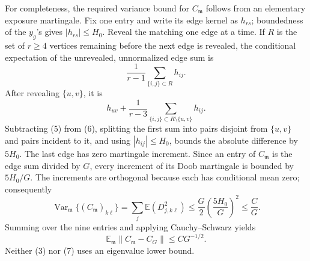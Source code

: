 For completeness, the required variance bound for \(C_{\mathfrak m}\) follows from an elementary exposure martingale.  Fix one entry and write its edge kernel as \(h_{rs}\); boundedness of the \(y_g\)'s gives \(|h_{rs}|\leq H_0\).  Reveal the matching one edge at a time.  If \(R\) is the set of \(r\geq4\) vertices remaining before the next edge is revealed, the conditional expectation of the unrevealed, unnormalized edge sum is
\[
 \frac1{r-1}\sum_{\{i,j\}\subset R}h_{ij}.                \tag{5}
\]
After revealing \(\{u,v\}\), it is
\[
 h_{uv}+\frac1{r-3}
       \sum_{\{i,j\}\subset R\setminus\{u,v\}}h_{ij}.    \tag{6}
\]
Subtracting (5) from (6), splitting the first sum into pairs disjoint from \(\{u,v\}\) and pairs incident to it, and using \(|h_{ij}|\leq H_0\), bounds the absolute difference by \(5H_0\).  The last edge has zero martingale increment.  Since an entry of \(C_{\mathfrak m}\) is the edge sum divided by \(G\), every increment of its Doob martingale is bounded by \(5H_0/G\).  The increments are orthogonal because each has conditional mean zero; consequently
\[
 \operatorname{Var}_{\mathfrak m}\{(C_{\mathfrak m})_{k\ell}\}
 =\sum_j\mathbb E(D_{j,k\ell}^2)
 \leq \frac G2\left(\frac{5H_0}{G}\right)^2
 \leq \frac{C}{G}.                                       \tag{7}
\]
Summing over the nine entries and applying Cauchy--Schwarz yields
\[
 \mathbb E_{\mathfrak m}\|C_{\mathfrak m}-C_G\|
 \leq C G^{-1/2}.                                         \tag{8}
\]
Neither (3) nor (7) uses an eigenvalue lower bound.

